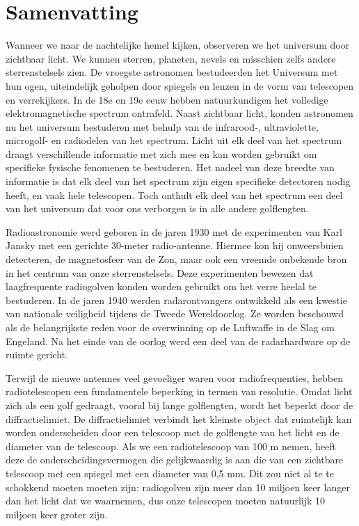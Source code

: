 \cleardoublepage 
{}
 

\chapter*{Samenvatting}\label{ch:summary_nl}

Wanneer we naar de nachtelijke hemel kijken, observeren we het universum door zichtbaar licht. We kunnen sterren, planeten, nevels en misschien zelfs andere sterrenstelsels zien. De vroegste astronomen bestudeerden het Universum met hun ogen, uiteindelijk geholpen door spiegels en lenzen in de vorm van telescopen en verrekijkers. In de 18e en 19e eeuw hebben natuurkundigen het volledige elektromagnetische spectrum ontrafeld. Naast zichtbaar licht, konden astronomen nu het universum bestuderen met behulp van de infrarood-, ultraviolette, microgolf- en radiodelen van het spectrum. Licht uit elk deel van het spectrum draagt verschillende informatie met zich mee en kan worden gebruikt om specifieke fysische fenomenen te bestuderen. Het nadeel van deze breedte van informatie is dat elk deel van het spectrum zijn eigen specifieke detectoren nodig heeft, en vaak hele telescopen. Toch onthult elk deel van het spectrum een deel van het universum dat voor ons verborgen is in alle andere golflengten.

Radioastronomie werd geboren in de jaren 1930 met de experimenten van Karl Jansky met een gerichte 30-meter radio-antenne. Hiermee kon hij onweersbuien detecteren, de magnetosfeer van de Zon, maar ook een vreemde onbekende bron in het centrum van onze sterrenstelsels. Deze experimenten bewezen dat laagfrequente radiogolven konden worden gebruikt om het verre heelal te bestuderen. In de jaren 1940 werden radarontvangers ontwikkeld als een kwestie van nationale veiligheid tijdens de Tweede Wereldoorlog. Ze worden beschouwd als de belangrijkste reden voor de overwinning op de Luftwaffe in de Slag om Engeland. Na het einde van de oorlog werd een deel van de radarhardware op de ruimte gericht.

Terwijl de nieuwe antennes veel gevoeliger waren voor radiofrequenties, hebben radiotelescopen een fundamentele beperking in termen van resolutie. Omdat licht zich als een golf gedraagt, vooral bij lange golflengten, wordt het beperkt door de diffractielimiet. De diffractielimiet verbindt het kleinste object dat ruimtelijk kan worden onderscheiden door een telescoop met de golflengte van het licht en de diameter van de telescoop. Als we een radiotelescoop van 100 m nemen, heeft deze de onderscheidingsvermogen die gelijkwaardig is aan die van een zichtbare telescoop met een spiegel met een diameter van 0,5 mm. Dit zou niet al te te schokkend moeten moeten zijn: radiogolven zijn meer dan 10 miljoen keer langer dan het licht dat we waarnemen, dus onze telescopen moeten natuurlijk 10 miljoen keer groter zijn.

